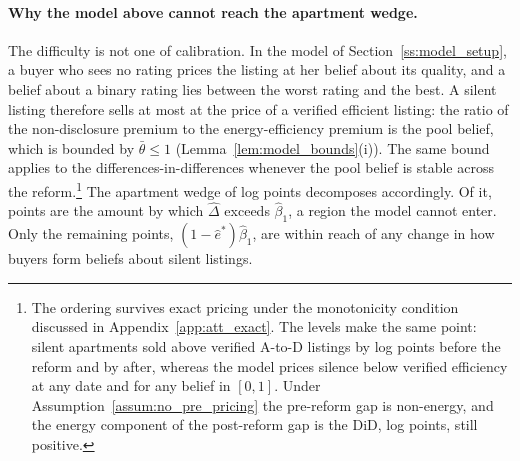 \paragraph{Why the model above cannot reach the apartment wedge.}
The difficulty is not one of calibration. In the model of Section~\ref{ss:model_setup}, a buyer who sees no rating prices the listing at her belief about its quality, and a belief about a binary rating lies between the worst rating and the best. A silent listing therefore sells at most at the price of a verified efficient listing: the ratio of the non-disclosure premium to the energy-efficiency premium is the pool belief, which is bounded by $\bar\theta\le1$ (Lemma~\ref{lem:model_bounds}(i)). The same bound applies to the differences-in-differences whenever the pool belief is stable across the reform.\footnote{The ordering survives exact pricing under the monotonicity condition discussed in Appendix~\ref{app:att_exact}. The levels make the same point: silent apartments sold above verified A-to-D listings by \attLevelGapPreApt{} log points before the reform and by \attLevelGapPostApt{} after, whereas the model prices silence below verified efficiency at any date and for any belief in $[0,1]$. Under Assumption~\ref{assum:no_pre_pricing} the pre-reform gap is non-energy, and the energy component of the post-reform gap is the DiD, \attExcessApt{} log points, still positive.} The apartment wedge of \attLamApt{} log points decomposes accordingly. Of it, \attExcessApt{} points are the amount by which $\hat\Delta$ exceeds $\hat\beta_1$, a region the model cannot enter. Only the remaining \attReachApt{} points, $(1-\hat e^*)\hat\beta_1$, are within reach of any change in how buyers form beliefs about silent listings.
